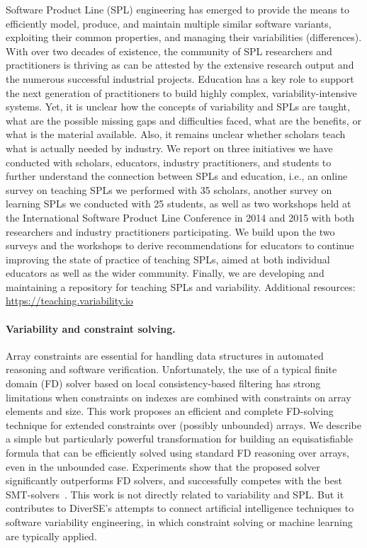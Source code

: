 Software Product Line (SPL) engineering has emerged to provide the means to efficiently model, produce, and maintain multiple similar software variants, exploiting their common properties, and managing their variabilities (differences). With over two decades of existence, the community of SPL researchers and practitioners is thriving as can be attested by the extensive research output and the numerous successful industrial projects. Education has a key role to support the next generation of practitioners to build highly complex, variability-intensive systems. Yet, it is unclear how the concepts of variability and SPLs are taught, what are the possible missing gaps and difficulties faced, what are the benefits, or what is the material available. Also, it remains unclear whether scholars teach what is actually needed by industry. We report on three initiatives we have conducted with scholars, educators, industry practitioners, and students to further understand the connection between SPLs and education, i.e., an online survey on teaching SPLs we performed with 35 scholars, another survey on learning SPLs we conducted with 25 students, as well as two workshops held at the International Software Product Line Conference in 2014 and 2015 with both researchers and industry practitioners participating. We build upon the two surveys and the workshops to derive recommendations for educators to continue improving the state of practice of teaching SPLs, aimed at both individual educators as well as the wider community. Finally, we are developing and maintaining a repository for teaching SPLs and variability.
Additional resources: \url{https://teaching.variability.io}

\paragraph{Variability and constraint solving.}  
Array constraints are essential for handling data structures in automated reasoning and software verification. Unfortunately, the use of a typical finite domain (FD) solver based on local consistency-based filtering has strong limitations when constraints on indexes are combined with constraints on array elements and size. This work proposes an efficient and complete FD-solving technique for extended constraints over (possibly unbounded) arrays. We describe a simple but particularly powerful transformation for building an equisatisfiable formula that can be efficiently solved using standard FD reasoning over arrays, even in the unbounded case. Experiments show that the proposed solver significantly outperforms FD solvers, and successfully competes with the best SMT-solvers~\cite{plazar:hal-01545557}.
This work is not directly related to variability and SPL. 
But it contributes to DiverSE's attempts to connect artificial intelligence techniques to software variability engineering, in which constraint solving or machine learning are typically applied. 

